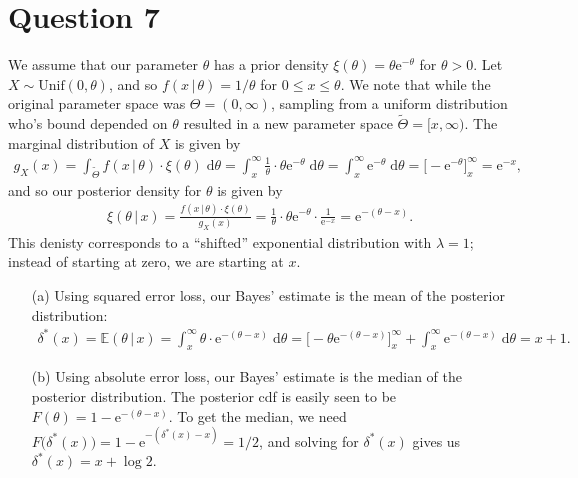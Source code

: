 \documentclass[10pt]{article}
\begin{document}
\section{Question 7} \noindent
We assume that our parameter \(\theta\) has a prior density \(\xi(\theta) = \theta \mathrm{e}^{-\theta}\) for \(\theta > 0\). 
Let \(X \sim \mathrm{Unif}(0, \theta)\), and so \(f(x \,|\, \theta) = 1 / \theta\) for \(0 \le x \le \theta\). We note that while the original parameter space
was \(\Theta = (0, \infty)\), sampling from a uniform distribution who's bound depended on \(\theta\) resulted in a new parameter space 
\(\tilde{\Theta} = [x, \infty)\). 
The marginal distribution of \(X\) is given by 
\begin{align*}
    g_{X}(x) 
    = \int_{\tilde{\Theta}} f(x \,|\, \theta) \cdot \xi(\theta) \;\mathrm{d}\theta
    = \int_x^{\infty} \frac{1}{\theta} \cdot \theta \mathrm{e}^{- \theta} \;\mathrm{d}\theta
    = \int_x^{\infty} \mathrm{e}^{- \theta} \;\mathrm{d}\theta
    = \Big[ -\mathrm{e}^{-\theta} \Big]_x^{\infty}
    = \mathrm{e}^{-x},
\end{align*}
and so our posterior density for \(\theta\) is given by 
\begin{align*}
    \xi(\theta \,|\, x) 
    = \frac{f(x \,|\, \theta) \cdot \xi(\theta)}{g_X(x)}
    = \frac{1}{\theta} \cdot \theta \mathrm{e}^{-\theta} \cdot \frac{1}{\mathrm{e}^{-x}}
    = \mathrm{e}^{-(\theta - x)}.
\end{align*}
This denisty corresponds to a ``shifted'' exponential distribution with \(\lambda = 1\); instead of starting at zero, we are starting at \(x\).
\begin{itemize}
    \item[(a)] Using squared error loss, our Bayes' estimate is the mean of the posterior distribution:
    \begin{align*}
        \delta^*(x)
        = \mathbb{E}(\theta \,|\, x)
        = \int_x^{\infty} \theta \cdot \mathrm{e}^{-(\theta - x)} \;\mathrm{d}\theta
        = \Big[ -\theta \mathrm{e}^{-(\theta - x)} \Big]_x^{\infty} + \int_x^{\infty} \mathrm{e}^{-(\theta - x)} \;\mathrm{d}\theta
        = x + 1.
    \end{align*}
    \item[(b)] Using absolute error loss, our Bayes' estimate is the median of the posterior distribution. 
    The posterior cdf is easily seen to be \(F(\theta) = 1 - \mathrm{e}^{-(\theta - x)}\).
    To get the median, we need 
    \(F \big( \delta^*(x) \big) = 1 - \mathrm{e}^{-(\delta^*(x) - x)} = 1/2\), and solving for \(\delta^*(x)\) gives us \(\delta^*(x) = x + \log 2\).
\end{itemize}
\end{document}
